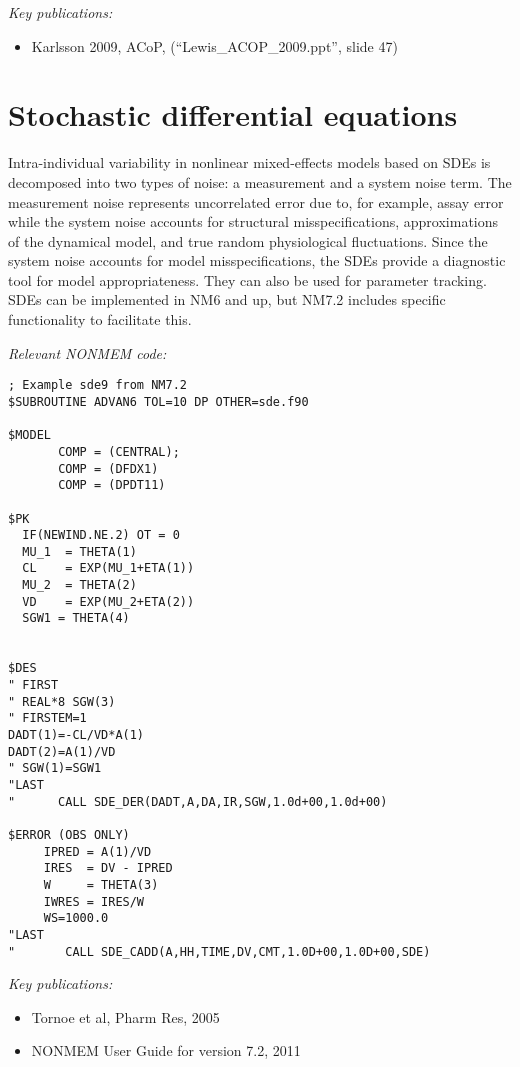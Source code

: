 \documentclass[a4paper,11pt]{article}
\begin{document}
\noindent \emph{Key publications:}
\begin{itemize}
\item Karlsson 2009, ACoP, (“Lewis\_ACOP\_2009.ppt”, slide 47)
\end{itemize}

\section{Stochastic differential equations}
Intra-individual variability in nonlinear mixed-effects models based
on SDEs is decomposed into two types of noise: a measurement and a
system noise term. The measurement noise represents uncorrelated error
due to, for example, assay error while the system noise accounts for
structural misspecifications, approximations of the dynamical model,
and true random physiological fluctuations. Since the system noise
accounts for model misspecifications, the SDEs provide a diagnostic
tool for model appropriateness. They can also be used for parameter
tracking. SDEs can be implemented in NM6 and up, but NM7.2 includes
specific functionality to facilitate this.

\vspace{10pt}
\noindent \emph{Relevant NONMEM code:}
{\small
\begin{lstlisting}
; Example sde9 from NM7.2
$SUBROUTINE ADVAN6 TOL=10 DP OTHER=sde.f90

$MODEL 
       COMP = (CENTRAL);
       COMP = (DFDX1)
       COMP = (DPDT11)

$PK
  IF(NEWIND.NE.2) OT = 0  
  MU_1  = THETA(1)
  CL    = EXP(MU_1+ETA(1)) 
  MU_2  = THETA(2)
  VD    = EXP(MU_2+ETA(2))
  SGW1 = THETA(4)


$DES
" FIRST
" REAL*8 SGW(3)
" FIRSTEM=1
DADT(1)=-CL/VD*A(1)
DADT(2)=A(1)/VD
" SGW(1)=SGW1
"LAST
"      CALL SDE_DER(DADT,A,DA,IR,SGW,1.0d+00,1.0d+00)
 
$ERROR (OBS ONLY)  
     IPRED = A(1)/VD
     IRES  = DV - IPRED
     W     = THETA(3)
     IWRES = IRES/W
     WS=1000.0
"LAST
"       CALL SDE_CADD(A,HH,TIME,DV,CMT,1.0D+00,1.0D+00,SDE)
\end{lstlisting}
}

\noindent \emph{Key publications:}
\begin{itemize}
\item Tornoe et al, Pharm Res, 2005
\item NONMEM User Guide for version 7.2, 2011
\end{itemize}
 
\end{document}
